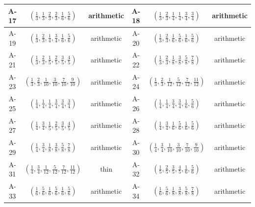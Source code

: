 \documentclass[11pt,a4paper]{amsart}
\theoremstyle{definition}
\theoremstyle{definition}
\numberwithin{equation}{section}
\begin{document}
{\begin{longtable}{|c|c|c|||c|c|c|}
\hline
A-17 & $\left(\frac{1}{3},\frac{1}{3},\frac{2}{3},\frac{2}{3},\frac{1}{6},\frac{5}{6}\right)$ & arithmetic \cite{bdss} &
A-18 & $\left(\frac{1}{3},\frac{2}{3},\frac{1}{4},\frac{1}{4},\frac{3}{4},\frac{3}{4}\right)$ & arithmetic \cite{bdss} \\
\hline
A-19 & $\left(\frac{1}{3},\frac{2}{3},\frac{1}{4},\frac{3}{4},\frac{1}{6},\frac{5}{6}\right)$ & arithmetic \cite{bdss} &
A-20 & $\left(\frac{1}{3},\frac{2}{3},\frac{1}{6},\frac{5}{6},\frac{1}{6},\frac{5}{6}\right)$ & arithmetic \cite{bdss} \\
\hline
A-21 & $\left(\frac{1}{3},\frac{2}{3},\frac{1}{5},\frac{2}{5},\frac{3}{5},\frac{4}{5}\right)$ & arithmetic \cite{BDN22} &
A-22 & $\left(\frac{1}{3},\frac{2}{3},\frac{1}{8},\frac{3}{8},\frac{5}{8},\frac{7}{8}\right)$ & arithmetic \cite{bdss} \\
\hline
A-23 & $\left(\frac{1}{3},\frac{2}{3},\frac{1}{10},\frac{3}{10},\frac{7}{10},\frac{9}{10}\right)$ & arithmetic \cite{bdss} &
A-24 & $\left(\frac{1}{3},\frac{2}{3},\frac{1}{12},\frac{5}{12},\frac{7}{12},\frac{11}{12}\right)$ & arithmetic \cite{BDN22} \\
\hline
A-25 & $\left(\frac{1}{4},\frac{1}{4},\frac{1}{4},\frac{3}{4},\frac{3}{4},\frac{3}{4}\right)$ & arithmetic \cite{bdss} &
A-26 & $\left(\frac{1}{4},\frac{1}{4},\frac{3}{4},\frac{3}{4},\frac{1}{6},\frac{5}{6}\right)$ & arithmetic \cite{bdss} \\
\hline
A-27 & $\left(\frac{1}{4},\frac{3}{4},\frac{1}{5},\frac{2}{5},\frac{3}{5},\frac{4}{5}\right)$ & arithmetic \cite{bdss} &
A-28 & $\left(\frac{1}{4},\frac{3}{4},\frac{1}{6},\frac{5}{6},\frac{1}{6},\frac{5}{6}\right)$ & arithmetic \cite{bdss} \\
\hline
A-29 & $\left(\frac{1}{4},\frac{3}{4},\frac{1}{8},\frac{3}{8},\frac{5}{8},\frac{7}{8}\right)$ & arithmetic \cite{bdss} &
A-30 & $\left(\frac{1}{4},\frac{3}{4},\frac{1}{10},\frac{3}{10},\frac{7}{10},\frac{9}{10}\right)$ & arithmetic \cite{bdss} \\
\hline
A-31 & $\left(\frac{1}{4},\frac{3}{4},\frac{1}{12},\frac{5}{12},\frac{7}{12},\frac{11}{12}\right)$ & thin &
A-32 & $\left(\frac{1}{5},\frac{2}{5},\frac{3}{5},\frac{4}{5},\frac{1}{6},\frac{5}{6}\right)$ & arithmetic \cite{bdss} \\
\hline
A-33 & $\left(\frac{1}{6},\frac{5}{6},\frac{1}{6},\frac{5}{6},\frac{1}{6},\frac{5}{6}\right)$ & arithmetic \cite{bdss} &
A-34 & $\left(\frac{1}{6},\frac{5}{6},\frac{1}{8},\frac{3}{8},\frac{5}{8},\frac{7}{8}\right)$ & arithmetic \cite{bdss} \\

\end{longtable}}
\end{document}
